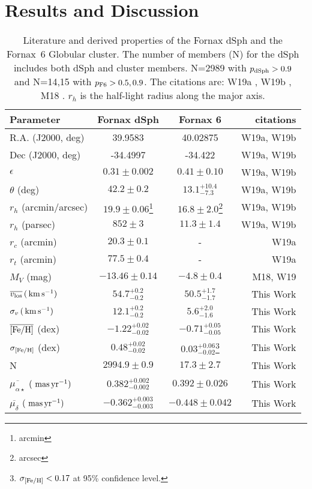 \documentclass[twocolumn]{aastex63}
\begin{document}
\section{Results and Discussion}
\label{label:results}

\begin{table*}[]
    \centering
\begin{tabular}{l c c r}
\hline
Parameter & Fornax dSph & Fornax 6  & citations \\
\hline
R.A. (J2000, deg) & 39.9583	& 40.02875 & W19a, W19b \\
Dec (J2000, deg) & -34.4997 & -34.422 & W19a, W19b \\
$\epsilon$ & $0.31\pm0.002$ &$0.41\pm 0.10$ & W19a, W19b\\ 
$\theta$ (deg) &  $42.2\pm0.2$ &$13.1_{-7.3}^{+10.4}$  & W19a, W19b\\ 
$r_h$ (arcmin/arcsec) & $19.9\pm0.06$\footnote{arcmin} & $16.8 \pm 2.0$\footnote{arcsec} & W19a, W19b \\ 
$r_h$ (parsec) &$852\pm3$ & $11.3 \pm 1.4$ & W19a, W19b\\ 
$r_c$ (arcmin) & $20.3\pm0.1$ & - & W19a\\ 
$r_t$ (arcmin) & $77.5\pm0.4$ & - & W19a\\ 
$M_V$ (mag) & $-13.46\pm0.14$ & $-4.8 \pm 0.4$ & M18, W19\\ 
\hline
$\overline{v_{\rm los}} \, (\mathrm{\,km} \mathrm{\,s}^{-1})$ & $54.7_{-0.2}^{+0.2}$ & $50.5_{-1.7}^{+1.7}$ & This Work \\
$\sigma_v \, (\mathrm{\,km} \mathrm{\,s}^{-1})$ & $12.1_{-0.2}^{+0.2}$ & $5.6_{-1.6}^{+2.0}$ & This Work \\
$\overline{{\rm [Fe/H]}}$ (dex) & $ -1.22_{-0.02}^{+0.02}$ &  $-0.71_{-0.05}^{+0.05}$ & This Work \\
$\sigma_{\rm [Fe/H]}$ (dex) & $0.48_{-0.02}^{+0.02}$ & $0.03_{-0.02}^{+0.06}$\footnote{$\sigma_{\rm [Fe/H]}<0.17$ at 95\% confidence level.} & This Work \\
N  & $2994.9\pm0.9$ & $17.3\pm2.7$ & This Work \\
$\overline{\mu_{\alpha \star}}$ $(\mathrm{\,\mathrm{\,mas} \mathrm{\,yr}^{-1}})$  & $0.382_{-0.002}^{+0.002}$ & $0.392\pm0.026$  & This Work \\
$\overline{\mu_{\delta }}$ $(\mathrm{\,\mathrm{\,mas} \mathrm{\,yr}^{-1}})$ & $-0.362_{-0.003}^{+0.003}$ & $-0.448\pm0.042$ & This Work \\
\hline
 \end{tabular}
    \caption{Literature and derived properties of the Fornax dSph and the Fornax~6 Globular cluster. 
    The number of members (N) for the dSph includes both dSph and cluster members.
    N=2989 with $p_{\rm dSph}>0.9$ and  N=14,15 with $p_{\rm F6} > 0.5, 0.9$.
    The citations are: W19a \citep{Wang2019ApJ...881..118W},
    W19b \citep{Wang2019ApJ...875L..13W}, 
    M18 \citep{Munoz2018ApJ...860...66M}.
    $r_h$ is the half-light radius along the major axis.
    }
    \label{tab:for6_properties}
\end{table*}
\end{document}
